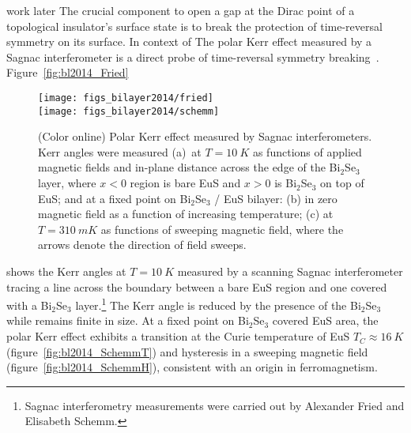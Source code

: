 {\color{red} work later} The crucial component to open a gap at the Dirac point of a topological insulator's surface state is to break the protection of time-reversal symmetry on its surface. In context of  The polar Kerr effect measured by a Sagnac interferometer is a direct probe of time-reversal symmetry breaking~\cite{Xia2006}. Figure~\ref{fig:bl2014_Fried} %
%
%
\begin{figure}[ht]%
\centering%
\subfloat{\label{fig:bl2014_Fried}}%
\subfloat{\label{fig:bl2014_SchemmT}}%
\subfloat{\label{fig:bl2014_SchemmH}}%
\texttt{[image: figs\_bilayer2014/fried]}\\
\texttt{[image: figs\_bilayer2014/schemm]}
\caption[Polar Kerr effect in Bi$_2$Se$_3$--EuS bilayers]{(Color online) Polar Kerr effect measured by Sagnac interferometers. Kerr angles were measured (a)~at $T=\SI{10}{K}$ as functions of applied magnetic fields and in-plane distance across the edge of the Bi$_2$Se$_3$ layer, where $x<0$ region is bare EuS and $x>0$ is Bi$_2$Se$_3$ on top of EuS; and at a fixed point on Bi$_2$Se$_3$ / EuS bilayer: (b) in zero magnetic field as a function of increasing temperature; (c) at $T=\SI{310}{mK}$ as functions of sweeping magnetic field, where the arrows denote the direction of field sweeps.}%
\end{figure}%
%
shows the Kerr angles at $T=\SI{10}{K}$ measured by a scanning Sagnac interferometer tracing a line across the boundary between a bare EuS region and one covered with a Bi$_2$Se$_3$ layer.\footnote{Sagnac interferometry measurements were carried out by Alexander Fried and Elisabeth Schemm.} The Kerr angle is reduced by the presence of the Bi$_2$Se$_3$ while remains finite in size. At a fixed point on Bi$_2$Se$_3$ covered EuS area, the polar Kerr effect exhibits a transition at the Curie temperature of EuS $T_C\approx\SI{16}{K}$ (figure~\ref{fig:bl2014_SchemmT}) and hysteresis in a sweeping magnetic field (figure~\ref{fig:bl2014_SchemmH}), consistent with an origin in ferromagnetism.

